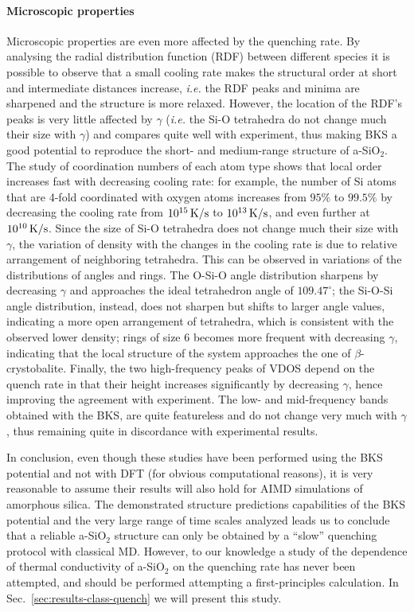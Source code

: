 \paragraph{Microscopic properties}
Microscopic properties are even more affected by the quenching rate. 
By analysing the radial distribution function (RDF) between different species it is possible to observe that a small cooling rate makes the structural order at short and intermediate distances increase, \emph{i.e.} the RDF peaks and minima are sharpened and the structure is more relaxed. However, the location of the RDF's peaks is very little affected by $\gamma$ (\emph{i.e.} the Si-O tetrahedra do not change much their size with $\gamma$) and compares quite well with experiment, thus making BKS a good potential to reproduce the short- and medium-range structure of a-SiO$_2$. 
The study of coordination numbers of each atom type shows that local order increases fast with decreasing cooling rate: for example, the number of Si atoms that are 4-fold coordinated with oxygen atoms increases from $95\%$ to $99.5\%$ by decreasing the cooling rate from $10^{15}\,\mathrm{K/s}$ to $10^{13}\,\mathrm{K/s}$, and even further at $10^{10}\,\mathrm{K/s}$.
Since the size of Si-O tetrahedra does not change much their size with $\gamma$, the variation of density with the changes in the cooling rate is due to relative arrangement of neighboring tetrahedra. 
This can be observed in variations of the distributions of angles and rings. The O-Si-O angle distribution sharpens by decreasing $\gamma$ and approaches the ideal tetrahedron angle of $109.47^\circ$; the Si-O-Si angle distribution, instead, does not sharpen but shifts to larger angle values, indicating a more open arrangement of tetrahedra, which is consistent with the observed lower density; rings of size $6$ becomes more frequent with decreasing $\gamma$, indicating that the local structure of the system approaches the one of $\beta$-crystobalite. 
Finally, the two high-frequency peaks of VDOS depend on the quench rate in that their height increases significantly by decreasing $\gamma$, hence improving the agreement with experiment. 
The low- and mid-frequency bands obtained with the BKS, are quite featureless and do not change very much with $\gamma$, thus remaining quite in discordance with experimental results. 

In conclusion, even though these studies have been performed using the BKS potential and not with DFT (for obvious computational reasons), it is very reasonable to assume their results will also hold for AIMD simulations of amorphous silica. 
The demonstrated structure predictions capabilities of the BKS potential and the very large range of time scales analyzed leads us to conclude that a reliable a-SiO$_2$ structure can only be obtained by a ``slow'' quenching protocol with classical MD. 
However, to our knowledge a study of the dependence of thermal conductivity of a-SiO$_2$ on the quenching rate has never been attempted, and should be performed attempting a first-principles calculation. In Sec.~\ref{sec:results-class-quench} we will present this study. 



